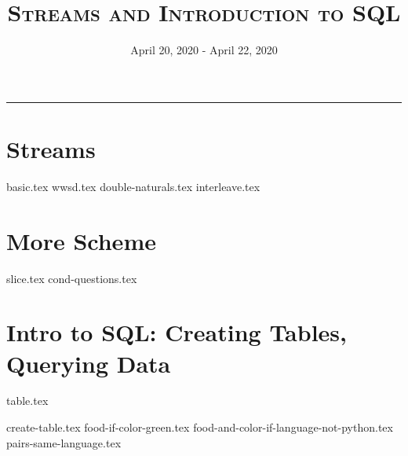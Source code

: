 \documentclass{exam}
\title{\textsc{Streams and Introduction to SQL}}
\date{April 20, 2020 - April 22, 2020}
\begin{document}
\maketitle\rule{\textwidth}{0.15em}
\fontsize{12}{15}\selectfont

\section{Streams}
\begin{questions}
{basic.tex}
\newpage
{wwsd.tex}
{double-naturals.tex}
{interleave.tex}
\end{questions}

\section{More Scheme}
\begin{questions}
{slice.tex}
\newpage
{cond-questions.tex}
\newpage
\end{questions}


\section{Intro to SQL: Creating Tables, Querying Data}
{table.tex}
\begin{questions}
{create-table.tex}
{food-if-color-green.tex}
{food-and-color-if-language-not-python.tex}
{pairs-same-language.tex}
\end{questions}
\end{document}
